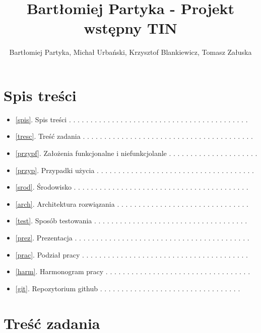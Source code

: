 \documentclass{article}
\author{Bartłomiej Partyka, Michał Urbański, Krzysztof Blankiewicz, Tomasz Załuska}
\title{Bartłomiej Partyka - Projekt wstępny TIN}
\begin{document}
\maketitle

\section{Spis treści\label{spis}}

\begin{itemize}

    \item \ref{spis}. Spis treści . . . . . . . . . . . . . . . . . . . . . . . . . . . . . . . . . . . . . . . . . . \pageref{spis}
    \item \ref{tresc}. Treść zadania . . . . . . . . . . . . . . . . . . . . . . . . . . . . . . . . . . . . . . . . \pageref{tresc}
    \item \ref{przypf}. Założenia funkcjonalne i niefunkcjolanle . . . . . . . . . . . . . . . . . . . . . \pageref{przypf}
    \item \ref{przyp}. Przypadki użycia . . . . . . . . . . . . . . . . . . . . . . . . . . . . . . . . . . . . . \pageref{przyp}
    \item \ref{srod}. Środowisko . . . . . . . . . . . . . . . . . . . . . . . . . . . . . . . . . . . . . . . . . \pageref{srod}
    \item \ref{arch}. Architektura rozwiązania . . . . . . . . . . . . . . . . . . . . . . . . . . . . . . . \pageref{arch}
    \item \ref{test}. Sposób testowania . . . . . . . . . . . . . . . . . . . . . . . . . . . . . . . . . . . . \pageref{test}
    \item \ref{prez}. Prezentacja . . . . . . . . . . . . . . . . . . . . . . . . . . . . . . . . . . . . . . . . . \pageref{prez}
    \item \ref{prac}. Podział pracy . . . . . . . . . . . . . . . . . . . . . . . . . . . . . . . . . . . . . . . \pageref{prac}
    \item \ref{harm}. Harmonogram pracy . . . . . . . . . . . . . . . . . . . . . . . . . . . . . . . . . . \pageref{harm}
    \item \ref{git}. Repozytorium github . . . . . . . . . . . . . . . . . . . . . . . . . . . . . . . . . \pageref{git}


\end{itemize}

\section{Treść zadania\label{tresc}}
\end{document}
